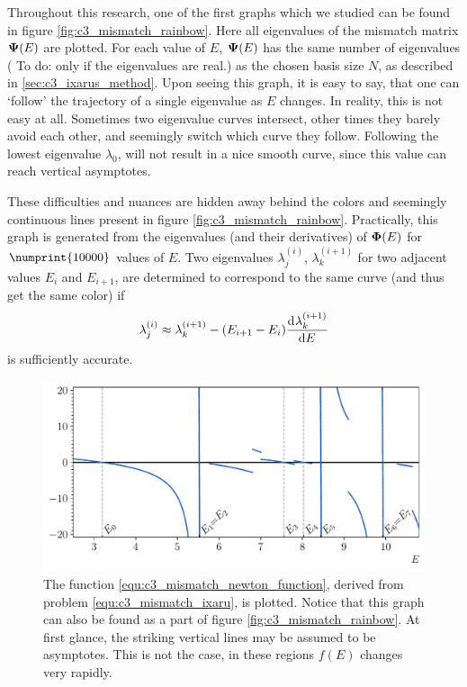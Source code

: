 Throughout this research, one of the first graphs which we studied can be found in figure \ref{fig:c3_mismatch_rainbow}. Here all eigenvalues of the mismatch matrix $\vb{\Psi}(E)$ are plotted. For each value of $E$, $\vb{\Psi}(E)$ has the same number of eigenvalues ({\color{red} To do: only if the eigenvalues are real.}) as the chosen basis size $N$, as described in \ref{sec:c3_ixarus_method}. Upon seeing this graph, it is easy to say, that one can `follow' the trajectory of a single eigenvalue as $E$ changes. In reality, this is not easy at all. Sometimes two eigenvalue curves intersect, other times they barely avoid each other, and seemingly switch which curve they follow. Following the lowest eigenvalue $\lambda_0$, will  not result in a nice smooth curve, since this value can reach vertical asymptotes.

These difficulties and nuances are hidden away behind the colors and seemingly continuous lines present in figure \ref{fig:c3_mismatch_rainbow}. Practically, this graph is generated from the eigenvalues (and their derivatives) of $\vb{\Phi}(E)$ for $\numprint{10000}$ values of $E$. Two eigenvalues $\lambda^{(i)}_j$, $\lambda^{(i+1)}_k$  for two adjacent values $E_{i}$ and $E_{i+1}$, are determined to correspond to the same curve (and thus get the same color) if
$$ \lambda^{(i)}_j \approx \lambda^{(i+1)}_k - (E_{i+1} - E_i) \dv[]{\lambda^{(i+1)}_k}{E} $$
is sufficiently accurate.

\begin{figure}
    \centering
    \includegraphics[width=\textwidth]{img/chapter3/mismatch_newton.pdf}
    \caption{\label{fig:c3_mismatch_newton} The function \eqref{equ:c3_mismatch_newton_function}, derived from problem \eqref{equ:c3_mismatch_ixaru}, is plotted. Notice that this graph can also be found as a part of figure \ref{fig:c3_mismatch_rainbow}. At first glance, the striking vertical lines may be assumed to be asymptotes. This is not the case, in these regions $f(E)$ changes very rapidly.}
\end{figure}


